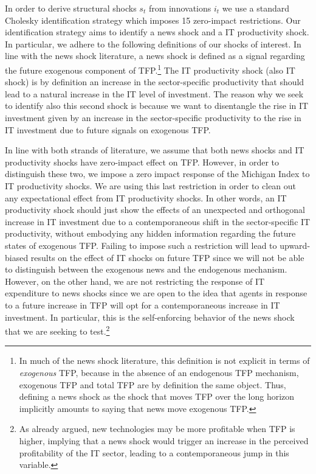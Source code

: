 \documentclass{article}
\begin{document}
In order to derive structural shocks $s_t$ from innovations $i_t$ we use a standard Cholesky identification strategy which imposes 15 zero-impact restrictions. Our identification strategy aims to identify a news shock and a IT productivity shock. In particular, we adhere to the following definitions of our shocks of interest. In line with the news shock literature, a news shock is defined as a signal regarding the future exogenous component of TFP.\footnote{In much of the news shock literature, this definition is not explicit in terms of \emph{exogenous} TFP, because in the absence of an endogenous TFP mechanism, exogenous TFP and total TFP are by definition the same object. Thus, defining a news shock as the shock that moves TFP over the long horizon implicitly amounts to saying that news move exogenous TFP.} The IT productivity shock (also IT shock) is by definition an increase in the sector-specific productivity that should lead to a natural increase in the IT level of investment. %
The reason why we seek to identify also this second shock is because we want to disentangle the rise in IT investment given by an increase in the sector-specific productivity to the rise in IT investment due to future signals on exogenous TFP. %

In line with both strands of literature, we assume that both news shocks and IT productivity shocks have zero-impact effect on TFP. However, in order to distinguish these two, we impose a zero impact response of the Michigan Index to IT productivity shocks. We are using this last restriction in order to clean out any expectational effect from IT productivity shocks. In other words, an IT productivity shock should just show the effects of an unexpected and orthogonal increase in IT investment due to a contemporaneous shift in the sector-specific IT productivity, without embodying any hidden information regarding the future states of exogenous TFP. Failing to impose such a restriction will lead to upward-biased results on the effect of IT shocks on future TFP since we will not be able to distinguish between the exogenous news and the endogenous mechanism. However, on the other hand, we are not restricting the response of IT expenditure to news shocks since we are open to the idea that agents in response to a future increase in TFP will opt for a contemporaneous increase in IT investment. In particular, this is the self-enforcing behavior of the news shock that we are seeking to test.\footnote{As already argued, new technologies may be more profitable when TFP is higher, implying that a news shock would trigger an increase in the perceived profitability of the IT sector, leading to a contemporaneous jump in this variable.}
\end{document}
